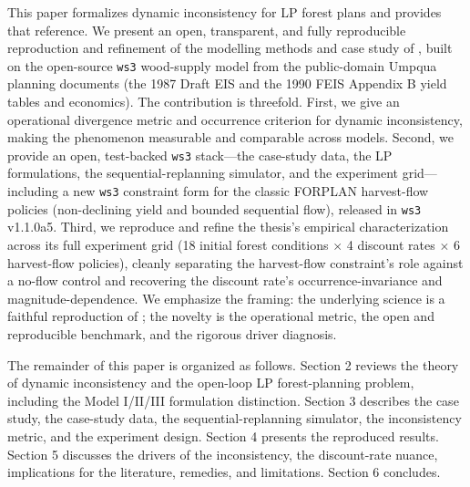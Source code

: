 This paper formalizes dynamic inconsistency for LP forest plans and provides that reference. We present an open, transparent, and fully reproducible reproduction and refinement of the modelling methods and case study of \citet{daugherty1991credibility}, built on the open-source \texttt{ws3} wood-supply model \citep{paradis2026ws3} from the public-domain Umpqua planning documents (the 1987 Draft EIS and the 1990 FEIS Appendix B yield tables and economics). The contribution is threefold. First, we give an operational divergence metric and occurrence criterion for dynamic inconsistency, making the phenomenon measurable and comparable across models. Second, we provide an open, test-backed \texttt{ws3} stack---the case-study data, the LP formulations, the sequential-replanning simulator, and the experiment grid---including a new \texttt{ws3} constraint form for the classic FORPLAN harvest-flow policies (non-declining yield and bounded sequential flow), released in \texttt{ws3} v1.1.0a5. Third, we reproduce and refine the thesis's empirical characterization across its full experiment grid (18 initial forest conditions $\times$ 4 discount rates $\times$ 6 harvest-flow policies), cleanly separating the harvest-flow constraint's role against a no-flow control and recovering the discount rate's occurrence-invariance and magnitude-dependence. We emphasize the framing: the underlying science is a faithful reproduction of \citet{daugherty1991credibility}; the novelty is the operational metric, the open and reproducible benchmark, and the rigorous driver diagnosis.

The remainder of this paper is organized as follows. Section 2 reviews the theory of dynamic inconsistency and the open-loop LP forest-planning problem, including the Model I/II/III formulation distinction. Section 3 describes the case study, the case-study data, the sequential-replanning simulator, the inconsistency metric, and the experiment design. Section 4 presents the reproduced results. Section 5 discusses the drivers of the inconsistency, the discount-rate nuance, implications for the literature, remedies, and limitations. Section 6 concludes.
